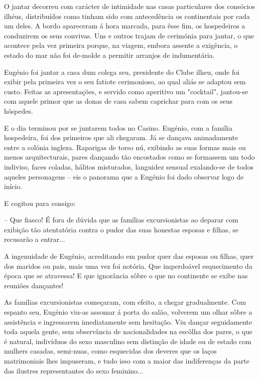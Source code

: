 \documentclass[9pt]{article}
\begin{document}
O jantar decorreu com carácter de intimidade nas casas particulares
dos consócios i\-lhéus, distribuídos como tinham sido com antecedên\-cia os
continentais por cada um deles. A bordo apareceram á hora marcada, para
êsse fim, os hospedeiros a conduzirem os seus convivas. Uns e outros trajam de cerimónia para jantar, o que acontece pela vez primeira porque, na
viagem, embora assente a exi\-gên\-cia, o estado do mar não foi de-molde a permitir arranjos de indumentária.

Eugé\-nio foi jantar a casa dum colega seu, presidente do Clube i\-lheu,
onde foi exibir pela primeira vez o seu fatiote cerimonioso, ao qual aliás se
 adaptou sem custo. Feitas as apresenta\-ções, e servido como aperitivo um
"cocktail", jantou-se com aquele primor que as donas de casa sabem caprichar para com os seus hóspedes.

E o dia terminou por se juntarem todos no Casino. Eugé\-nio, com a fa\-mí\-lia hospedeira, foi dos primeiros que ali chegaram. Já se dan\-çava animadamente entre a colónia ingleza. Raparigas de torso nú, exibindo as suas
formas mais ou menos arquitecturais, pares dan\-çando tão encostados como se
formassem um todo indiviso, faces coladas, hálitos misturados, languidez sensual exalando-se de todos aqueles personagens -- eis o panorama que a Eugé\-nio foi dado observar logo de início.

E cogitou para consigo:

-- Que fiasco! É fora de dúvida que as fa\-mí\-lias excursionistas ao deparar com exibi\-ção tão atentatória contra o pudor das suas honestas esposas e fi\-lhas, se recusarão a entrar...

A ingenuidade de Eugé\-nio, acreditando em pudor quer das esposas ou fi\-lhas, quer dos maridos ou pais, mais uma vez foi notória. Que imperdoável
esquecimento da época que se atravessa! E que ignorância sôbre o que no
continente se exibe nas reuniões dan\-çantes!

As fa\-mí\-lias excursionistas começaram, com efeito, a chegar gra\-dual\-mente. Com espanto seu, Eugé\-nio viu-as assomar á porta do salão, volverem um o\-lhar
sôbre a assistência e ingressarem imediatamente sem hesita\-ção. Viu dan\-çar
seguidamente toda aquela gente, sem observância de na\-cio\-nalidades na escô\-lha dos pares, o que é natural, indivíduos do sexo masculino sem distin\-ção
de idade ou de estado com mu\-lhers casadas, semi-nuas, como esquecidas dos
deveres que os laços matrimoniais lhes impuseram, e tudo isso com a maior
das indiferenças da parte das ilustres representantes do sexo feminino...
\end{document}

